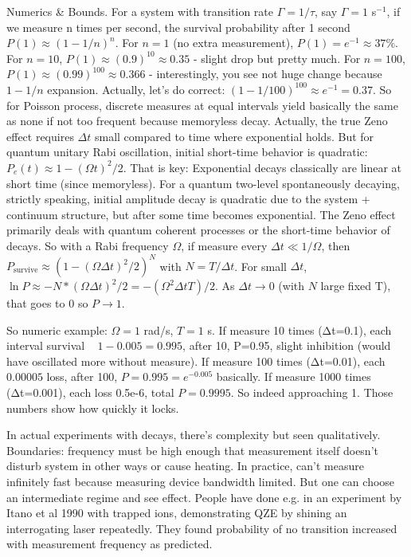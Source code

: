 \documentclass[11pt]{article}
\begin{document}
Numerics & Bounds. For a system with transition rate $\Gamma = 1/\tau$, say $\Gamma = 1$ s$^{-1}$, if we measure n times per second, the survival probability after 1 second $P(1) \approx (1 - 1/n)^n$. For $n=1$ (no extra measurement), $P(1)=e^{-1}\approx37\%$. For $n=10$, $P(1) \approx (0.9)^{10} \approx 0.35$ - slight drop but pretty much. For $n=100$, $P(1) \approx (0.99)^{100} \approx 0.366$ - interestingly, you see not huge change because $1-1/n$ expansion. Actually, let's do correct: $(1 - 1/100)^{100} \approx e^{-1} = 0.37$. So for Poisson process, discrete measures at equal intervals yield basically the same as none if not too frequent because memoryless decay. Actually, the true Zeno effect requires $\Delta t$ small compared to time where exponential holds. But for quantum unitary Rabi oscillation, initial short-time behavior is quadratic: $P_e(t) \approx 1 - (\Omega t)^2/2$. That is key: Exponential decays classically are linear at short time (since memoryless). For a quantum two-level spontaneously decaying, strictly speaking, initial amplitude decay is quadratic due to the system + continuum structure, but after some time becomes exponential. The Zeno effect primarily deals with quantum coherent processes or the short-time behavior of decays. So with a Rabi frequency $\Omega$, if measure every $\Delta t \ll 1/\Omega$, then $P_{\text{survive}} \approx (1 - (\Omega \Delta t)^2/2)^{N}$ with $N=T/\Delta t$. For small $\Delta t$, $\ln P \approx -N * (\Omega \Delta t)^2/2 = -(\Omega^2 \Delta t T)/2$. As $\Delta t \to 0$ (with $N$ large fixed T), that goes to 0 so $P \to 1$.

So numeric example: $\Omega = 1$ rad/s, $T=1$ s. If measure 10 times (Δt=0.1), each interval survival ~ $1 - 0.005 =0.995$, after 10, P=0.95, slight inhibition (would have oscillated more without measure). If measure 100 times (Δt=0.01), each $0.00005$ loss, after 100, $P=0.995 = e^{-0.005}$ basically. If measure 1000 times (Δt=0.001), each loss 0.5e-6, total $P=0.9995$. So indeed approaching 1. Those numbers show how quickly it locks.

In actual experiments with decays, there's complexity but seen qualitatively. Boundaries: frequency must be high enough that measurement itself doesn't disturb system in other ways or cause heating. In practice, can't measure infinitely fast because measuring device bandwidth limited. But one can choose an intermediate regime and see effect. People have done e.g. in an experiment by Itano et al 1990 with trapped ions, demonstrating QZE by shining an interrogating laser repeatedly. They found probability of no transition increased with measurement frequency as predicted.
\end{document}

